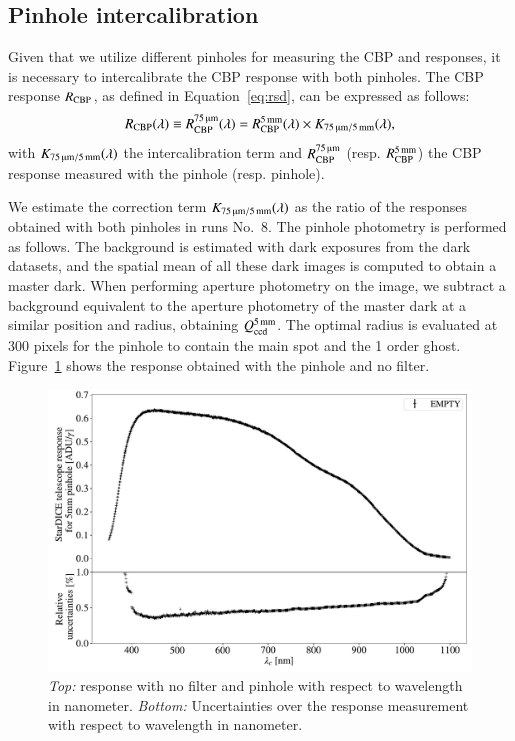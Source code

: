 \subsection{Pinhole intercalibration}

Given that we utilize different pinholes for measuring the CBP and \SD responses, it is necessary to intercalibrate the CBP response with both pinholes. The CBP response $R_{\mathrm{CBP}}$, as defined in Equation~\ref{eq:rsd}, can be expressed as follows:
\begin{equation}
  \label{eq:K}
	R_{\mathrm{CBP}}(\lambda) \equiv R_{\mathrm{CBP}}^{\SI{75}{\micro\meter}}(\lambda) = R_{\mathrm{CBP}}^{\SI{5}{\milli\meter}}(\lambda) \times K_\mathrm{\SI{75}{\micro\meter}/\SI{5}{\milli\meter}}(\lambda),
\end{equation}
with $K_\mathrm{\SI{75}{\micro\meter}/\SI{5}{\milli\meter}}(\lambda)$ the intercalibration term and $R_{\mathrm{CBP}}^{\SI{75}{\micro\meter}}$ (resp. $R_{\mathrm{CBP}}^{\SI{5}{\milli\meter}}$) the CBP response measured with the \spinhole pinhole (resp. \bpinhole pinhole). 

We estimate the correction term $K_\mathrm{\SI{75}{\micro\meter}/\SI{5}{\milli\meter}}(\lambda)$ as the ratio of the \SD responses obtained with both pinholes in runs No.~8. The \bpinhole pinhole photometry is performed as follows. The background is estimated with dark exposures from the dark datasets, and the spatial mean of all these dark images is computed to obtain a master dark. When performing aperture photometry on the \bpinhole image, we subtract a background equivalent to the aperture photometry of the master dark at a similar position and radius, obtaining $Q_{\mathrm{ccd}}^{\SI{5}{\milli\meter}}$. The optimal radius is evaluated at 300 pixels for the \bpinhole pinhole to contain the main spot and the 1 order ghost. Figure~\ref{fig:stardice_5mm_response} shows the \SD response obtained with the \bpinhole pinhole and no filter. 


\begin{figure}[h]
    \centering
    \includegraphics[width=\columnwidth]{fig/stardice_5mm_response.pdf}
    \caption{\textit{Top:} \SD response with no filter and \bpinhole pinhole with respect to wavelength in nanometer. \textit{Bottom:} Uncertainties over the \SD response measurement with respect to wavelength in nanometer.}
    \label{fig:stardice_5mm_response}
\end{figure}

